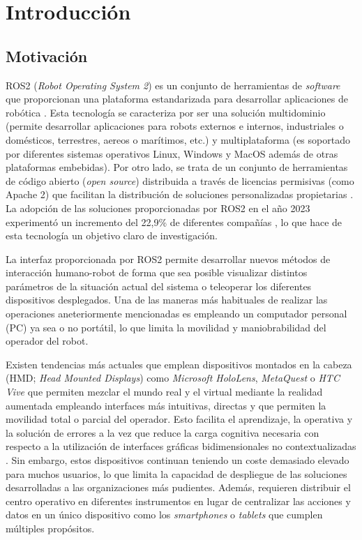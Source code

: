 \chapter{Introducción}\label{chap:introduccion}

\section{Motivación}
ROS2 (\textit{Robot Operating System 2}) es un conjunto de herramientas de \textit{software} 
que proporcionan una plataforma estandarizada para desarrollar aplicaciones 
de robótica \parencite{rosROSROS}.
Esta tecnología se caracteriza por ser una solución multidominio (permite
desarrollar aplicaciones para robots externos e internos, industriales 
o domésticos, terrestres, aereos o marítimos, etc.) y 
multiplataforma (es soportado por diferentes sistemas operativos 
Linux, Windows y MacOS además de otras plataformas embebidas). 
Por otro lado, se trata de un conjunto de herramientas de código abierto
(\textit{open source}) distribuida a través de licencias permisivas 
(como Apache 2) que facilitan la distribución de soluciones 
personalizadas propietarias \parencite{rosROSROS}.
La adopción de las soluciones proporcionadas por ROS2 en el año 
2023 experimentó un incremento del 22,9\% de diferentes compañías \parencite{ros2Metrics}, lo que 
hace de esta tecnología un objetivo claro de investigación.

La interfaz proporcionada por ROS2 permite desarrollar nuevos métodos de 
interacción humano-robot de forma que sea posible visualizar distintos 
parámetros de la situación actual del sistema o teleoperar los diferentes 
dispositivos desplegados. Una de las maneras más habituales de realizar 
las operaciones aneteriormente mencionadas es empleando un computador 
personal (PC) ya sea o no portátil, lo que limita la movilidad y maniobrabilidad 
del operador del robot.

Existen tendencias más actuales que emplean dispositivos montados en la 
cabeza (HMD; \textit{Head Mounted Displays}) como \textit{Microsoft HoloLens},
\textit{MetaQuest} o \textit{HTC Vive} que permiten mezclar el mundo 
real y el virtual mediante la realidad aumentada empleando interfaces más 
intuitivas, directas y que permiten la movilidad total o parcial del operador.
Esto facilita el aprendizaje, la operativa y la solución de errores a la vez que 
reduce la carga cognitiva necesaria con respecto a la utilización de interfaces 
gráficas bidimensionales no contextualizadas \parencite{richardsetal, robotics14080106}.
Sin embargo, estos dispositivos continuan teniendo un coste demasiado elevado
para muchos usuarios, lo que 
limita la capacidad de despliegue de las soluciones 
desarrolladas a las organizaciones más pudientes. 
Además, requieren distribuir el centro operativo 
en diferentes instrumentos en lugar de centralizar las 
acciones y datos en un único dispositivo como 
los \textit{smartphones} o \textit{tablets} que cumplen múltiples 
propósitos.

